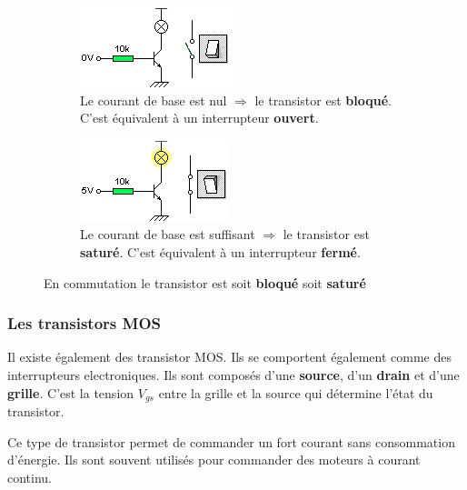 \documentclass[10pt,fleqn]{article} %
\begin{document}
  \begin{figure}[h]
    \begin{subfigure}{.45\textwidth}
      \includegraphics[width=.6\textwidth]{images/transistor_ouvert}
      \centering
      \caption{Le courant de base est nul $\Rightarrow$ le transistor est \textbf{bloqué}. C'est équivalent à un interrupteur \textbf{ouvert}.}
    \end{subfigure}\hfill
    \begin{subfigure}{.45\textwidth}
      \centering
      \includegraphics[width=.6\textwidth]{images/transistor_ferme}
      \caption{Le courant de base est suffisant $\Rightarrow$ le transistor est \textbf{saturé}. C'est équivalent à un interrupteur \textbf{fermé}.}
    \end{subfigure}

    \caption{En commutation le transistor est soit \textbf{bloqué} soit \textbf{saturé}}
    \label{}
  \end{figure}

\subsubsection{Les transistors MOS}
  Il existe également des transistor MOS. Ils se comportent également comme des interrupteurs electroniques. Ils sont composés d'une \textbf{source}, d'un \textbf{drain} et d'une \textbf{grille}. C'est la tension $V_{gs}$ entre la grille et la source qui détermine l'état du transistor.

  \begin{remark}
    Ce type de transistor permet de commander un fort courant sans consommation d'énergie. Ils sont souvent utilisés pour commander des moteurs à courant continu.
  \end{remark}
\end{document}
